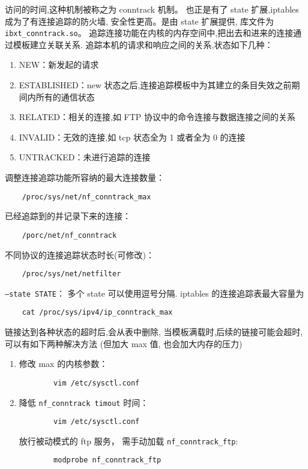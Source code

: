 \begin{enumerate}
    访问的时间,这种机制被称之为 conntrack 机制。
    也正是有了 state 扩展,iptables 成为了有连接追踪的防火墙,
    安全性更高。是由 state 扩展提供,
    库文件为 \texttt{ibxt_conntrack.so}。
    追踪连接功能在内核的内存空间中,把出去和进来的连接通过模板建立关联关系.
    追踪本机的请求和响应之间的关系,状态如下几种：
    \begin{enumerate}
      \item NEW：新发起的请求
      \item ESTABLISHED：new 状态之后,连接追踪模板中为其建立的条目失效之前期间内所有的通信状态
      \item RELATED：相关的连接,如 FTP 协议中的命令连接与数据连接之间的关系
      \item INVALID：无效的连接,如 tcp 状态全为 1 或者全为 0 的连接
      \item UNTRACKED：未进行追踪的连接
    \end{enumerate}
    调整连接追踪功能所容纳的最大连接数量：
    \begin{verbatim}
    /proc/sys/net/nf_conntrack_max
    \end{verbatim}
    已经追踪到的并记录下来的连接：
    \begin{verbatim}
    /porc/net/nf_conntrack
    \end{verbatim}
    不同协议的连接追踪状态时长(可修改)：
    \begin{verbatim}
    /proc/sys/net/netfilter
    \end{verbatim}
    \texttt{--state STATE}：
    多个 state 可以使用逗号分隔.
    iptables 的连接追踪表最大容量为
    \begin{verbatim}
    cat /proc/sys/ipv4/ip_conntrack_max
    \end{verbatim}
    链接达到各种状态的超时后,会从表中删除,
    当模板满载时,后续的链接可能会超时,可以有如下两种解决方法
    (但加大 max 值, 也会加大内存的压力)
    \begin{enumerate}
      \item 修改 max 的内核参数：
        \begin{verbatim}
        vim /etc/sysctl.conf
        \end{verbatim}
      \item 降低 \texttt{nf_conntrack timout} 时间：
        \begin{verbatim}
        vim /etc/sysctl.conf
        \end{verbatim}
        放行被动模式的 ftp 服务，
        需手动加载 \texttt{nf_conntrack_ftp}:
        \begin{verbatim}
        modprobe nf_conntrack_ftp
        \end{verbatim}
    \end{enumerate}
\end{enumerate}
